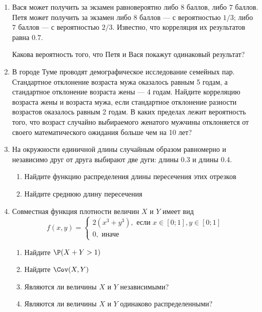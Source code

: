 \begin{enumerate}
\item Вася может получить за экзамен равновероятно либо $8$ баллов, либо $7$ баллов. Петя может получить за экзамен либо $8$ баллов — с вероятностью $1/3$; либо $7$ баллов — с вероятностью $2/3$. Известно, что корреляция их результатов равна $0.7$.

Какова вероятность того, что Петя и Вася покажут одинаковый результат?

\item В  городе Туме проводят демографическое исследование семейных пар. Стандартное отклонение возраста мужа оказалось равным 5 годам, а стандартное отклонение возраста жены — 4 годам. Найдите корреляцию возраста жены и возраста мужа, если стандартное отклонение разности возрастов оказалось равным 2 годам. В каких пределах лежит вероятность того, что возраст случайно выбираемого женатого мужчины отклоняется от своего математического ожидания больше чем на 10 лет?


\item На окружности единичной длины случайным образом равномерно и независимо друг от друга выбирают две дуги: длины $0.3$ и длины $0.4$.
\begin{enumerate}
\item  Найдите функцию распределения длины пересечения этих отрезков
\item Найдите среднюю длину пересечения
\end{enumerate}


\item  Совместная функция плотности величин $X$ и $Y$ имеет вид
\begin{equation}
\nonumber
f(x,y)=\begin{cases}
2(x^3+y^3), \text{ если } x\in [0;1], y\in [0;1] \\
0, \mbox{ иначе}
\end{cases}
\end{equation}
\begin{enumerate}
\item Найдите $\P(X+Y>1)$
\item Найдите $\Cov(X,Y)$
\item Являются ли величины $X$ и $Y$ независимыми?
\item Являются ли величины $X$ и $Y$ одинаково распределенными?
\end{enumerate}




\end{enumerate}
